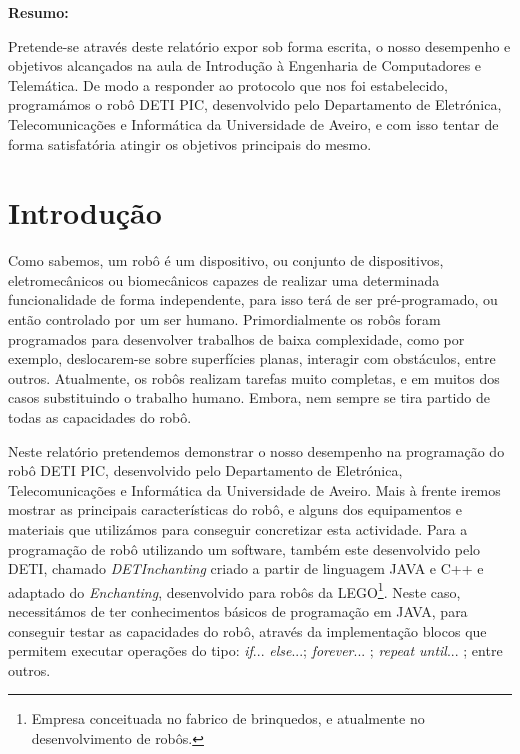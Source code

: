 \documentclass[a4paper, 12pt, onecolumn, oneside]{report}
\begin{document}
\vspace*{\fill}



\textbf{Resumo:}


\begin{flushleft}

 Pretende-se através deste relatório expor sob forma escrita, o nosso desempenho e objetivos alcançados na aula de Introdução à Engenharia de Computadores e Telemática. De modo a responder ao protocolo que nos foi estabelecido, programámos o robô DETI PIC, desenvolvido pelo Departamento de Eletrónica, Telecomunicações e Informática da Universidade de Aveiro, e com isso tentar de forma satisfatória atingir os objetivos principais do mesmo.

\end{flushleft}


\vspace*{\fill}

\newpage




\newpage

\renewcommand*\contentsname{Índice}

\tableofcontents 


\newpage
 
\section{Introdução} 


Como sabemos, um robô é um dispositivo, ou conjunto de dispositivos, eletromecânicos ou biomecânicos capazes de realizar uma determinada funcionalidade de forma independente, para isso terá de ser pré-programado, ou então controlado por um ser humano. Primordialmente os robôs foram programados para desenvolver trabalhos de baixa complexidade, como por exemplo, deslocarem-se sobre superfícies planas, interagir com obstáculos, entre outros. Atualmente, os robôs realizam tarefas muito completas, e em muitos dos casos substituindo o trabalho humano. Embora, nem sempre se tira partido de todas as capacidades do robô.

Neste relatório pretendemos demonstrar o nosso desempenho na programação do robô DETI PIC, desenvolvido pelo Departamento de Eletrónica, Telecomunicações e Informática da Universidade de Aveiro. Mais à frente iremos mostrar as principais características do robô, e alguns dos equipamentos e materiais que utilizámos para conseguir concretizar esta actividade. Para a programação de robô utilizando um software, também este desenvolvido pelo DETI, chamado \emph{DETInchanting} criado a partir de linguagem JAVA e C++ e adaptado do \emph{Enchanting}, desenvolvido para robôs da LEGO\footnote{Empresa conceituada no fabrico de brinquedos, e atualmente no desenvolvimento de robôs. }. Neste caso, necessitámos de ter conhecimentos básicos de programação em JAVA, para conseguir testar as capacidades do robô, através da implementação blocos que permitem executar operações do tipo: \emph{if}... \emph{else}...; \emph{forever}... ; \emph{repeat until}... ; entre outros. 
\end{document}
